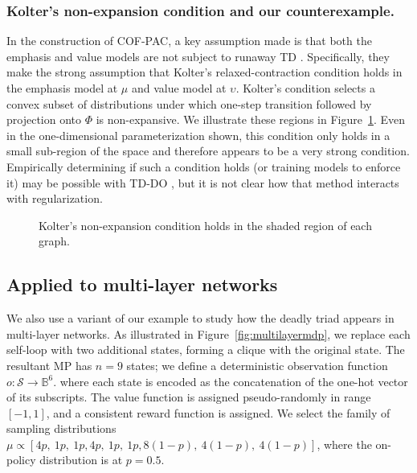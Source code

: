 \subsubsection{Kolter's non-expansion condition and our counterexample. }
In the construction of COF-PAC, a key assumption made is that both the emphasis and value models are not subject to runaway TD \cite[asm.~4]{zhang2020provably}. Specifically, they make the strong assumption that Kolter's relaxed-contraction condition \cite[eqn.~10]{kolter2011fixed} holds in the emphasis model at $\mu$ and value model at $\upsilon$. Kolter's condition selects a convex subset of distributions under which one-step transition followed by projection onto $\Phi$ is non-expansive. We illustrate these regions in Figure~\ref{fig:koldercond}. Even in the one-dimensional parameterization shown, this condition only holds in a small sub-region of the space and therefore appears to be a very strong condition. Empirically determining if such a condition holds (or training models to enforce it) may be possible with TD-DO \cite[sec~4.1]{kolter2011fixed}, but it is not clear how that method interacts with regularization. \label{sec:nosingularity}

\begin{figure}
  \centering
  
  \caption{Kolter's non-expansion condition holds in the shaded region of each graph. }
  \label{fig:koldercond}
\end{figure}


\subsection{Applied to multi-layer networks}
\label{sec:multilayerapp}

We also use a variant of our example to study how the deadly triad appears in multi-layer networks. As illustrated in Figure~\ref{fig:multilayermdp}, we replace each self-loop with two additional states, forming a clique with the original state. The resultant MP has $n=9$ states; we define a deterministic observation function $o : \mathcal S \to \mathbb B^6$. where each state is encoded as the concatenation of the one-hot vector of its subscripts. The value function is assigned pseudo-randomly in range $[-1, 1]$, and a consistent reward function is assigned.
We select the family of sampling distributions $\mu \propto [4p,~1p,~1p,4p,~1p,~1p,8(1-p),~4(1-p),~4(1-p)]$, where the on-policy distribution is at $p=0.5$.

